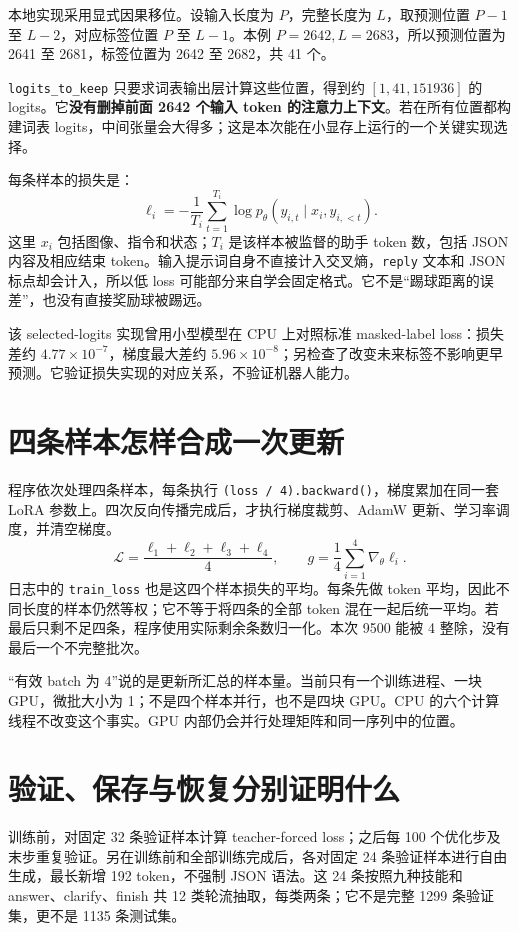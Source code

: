 本地实现采用显式因果移位。设输入长度为 $P$，完整长度为 $L$，取预测位置 $P-1$ 至 $L-2$，对应标签位置 $P$ 至 $L-1$。本例 $P=2642,L=2683$，所以预测位置为 2641 至 2681，标签位置为 2642 至 2682，共 41 个。

\texttt{logits\_to\_keep} 只要求词表输出层计算这些位置，得到约 $[1,41,151936]$ 的 logits。它\textbf{没有删掉前面 2642 个输入 token 的注意力上下文}。若在所有位置都构建词表 logits，中间张量会大得多；这是本次能在小显存上运行的一个关键实现选择。

每条样本的损失是：
\[
\ell_i=-\frac{1}{T_i}\sum_{t=1}^{T_i}
\log p_\theta(y_{i,t}\mid x_i,y_{i,<t}).
\]
这里 $x_i$ 包括图像、指令和状态；$T_i$ 是该样本被监督的助手 token 数，包括 JSON 内容及相应结束 token。输入提示词自身不直接计入交叉熵，\texttt{reply} 文本和 JSON 标点却会计入，所以低 loss 可能部分来自学会固定格式。它不是“踢球距离的误差”，也没有直接奖励球被踢远。

该 selected-logits 实现曾用小型模型在 CPU 上对照标准 masked-label loss：损失差约 $4.77\times10^{-7}$，梯度最大差约 $5.96\times10^{-8}$；另检查了改变未来标签不影响更早预测。它验证损失实现的对应关系，不验证机器人能力。

\section{四条样本怎样合成一次更新}

程序依次处理四条样本，每条执行 \texttt{(loss / 4).backward()}，梯度累加在同一套 LoRA 参数上。四次反向传播完成后，才执行梯度裁剪、AdamW 更新、学习率调度，并清空梯度。
\[
\mathcal{L}=\frac{\ell_1+\ell_2+\ell_3+\ell_4}{4},
\qquad g=\frac{1}{4}\sum_{i=1}^{4}\nabla_\theta\ell_i.
\]
日志中的 \texttt{train\_loss} 也是这四个样本损失的平均。每条先做 token 平均，因此不同长度的样本仍然等权；它不等于将四条的全部 token 混在一起后统一平均。若最后只剩不足四条，程序使用实际剩余条数归一化。本次 9500 能被 4 整除，没有最后一个不完整批次。

“有效 batch 为 4”说的是更新所汇总的样本量。当前只有一个训练进程、一块 GPU，微批大小为 1；不是四个样本并行，也不是四块 GPU。CPU 的六个计算线程不改变这个事实。GPU 内部仍会并行处理矩阵和同一序列中的位置。

\section{验证、保存与恢复分别证明什么}

训练前，对固定 32 条验证样本计算 teacher-forced loss；之后每 100 个优化步及末步重复验证。另在训练前和全部训练完成后，各对固定 24 条验证样本进行自由生成，最长新增 192 token，不强制 JSON 语法。这 24 条按照九种技能和 answer、clarify、finish 共 12 类轮流抽取，每类两条；它不是完整 1299 条验证集，更不是 1135 条测试集。

